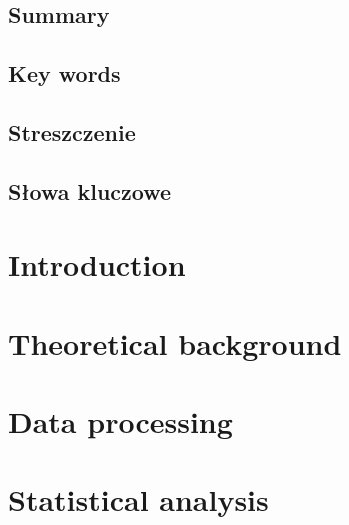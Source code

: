 \documentclass[12pt]{report}
\begin{document}
    
    \pagestyle{empty}
    \section*{Summary}
    \section*{Key words}
    \newpage
    \pagestyle{empty}
    \section*{Streszczenie}
    \section*{Słowa kluczowe}
    
    
    \tableofcontents
    
    
    \pagestyle{fancy}
    \chapter{Introduction} \label{ch:introduction}
%    
    \chapter{Theoretical background}
    
    \chapter{Data processing}
%    
    \chapter{Statistical analysis}
%    


\end{document}
